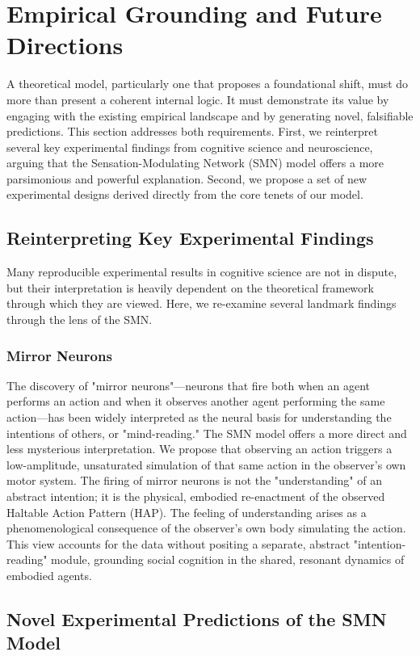 \section{Empirical Grounding and Future Directions}
\label{sec:empirical}
A theoretical model, particularly one that proposes a foundational shift, must do more than present a coherent internal logic. It must demonstrate its value by engaging with the existing empirical landscape and by generating novel, falsifiable predictions. This section addresses both requirements. First, we reinterpret several key experimental findings from cognitive science and neuroscience, arguing that the Sensation-Modulating Network (SMN) model offers a more parsimonious and powerful explanation. Second, we propose a set of new experimental designs derived directly from the core tenets of our model.

\subsection{Reinterpreting Key Experimental Findings}
\label{subsec:reinterpreting}
Many reproducible experimental results in cognitive science are not in dispute, but their interpretation is heavily dependent on the theoretical framework through which they are viewed. Here, we re-examine several landmark findings through the lens of the SMN.

\subsubsection{Mirror Neurons}
\label{ssubsec:mirror_neurons}
The discovery of "mirror neurons"—neurons that fire both when an agent performs an action and when it observes another agent performing the same action—has been widely interpreted as the neural basis for understanding the intentions of others, or "mind-reading." The SMN model offers a more direct and less mysterious interpretation. We propose that observing an action triggers a low-amplitude, unsaturated simulation of that same action in the observer's own motor system. The firing of mirror neurons is not the "understanding" of an abstract intention; it is the physical, embodied re-enactment of the observed Haltable Action Pattern (HAP). The feeling of understanding arises as a phenomenological consequence of the observer's own body simulating the action. This view accounts for the data without positing a separate, abstract "intention-reading" module, grounding social cognition in the shared, resonant dynamics of embodied agents.

\subsection{Novel Experimental Predictions of the SMN Model}
\label{subsec:predictions}
